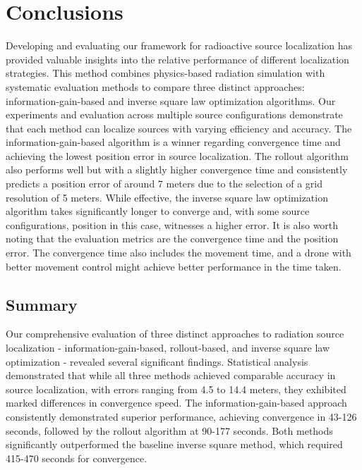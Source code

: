 \documentclass[../report.tex]{subfiles}
\begin{document}
    \section{Conclusions}
    \label{sec:conclusions}
    Developing and evaluating our framework for radioactive source localization has provided valuable insights into the relative performance of different 
    localization strategies. This method combines physics-based radiation simulation with systematic evaluation methods to compare three distinct approaches: information-gain-based
    and inverse square law optimization algorithms. Our experiments and evaluation across multiple source configurations demonstrate that each method can localize sources with
    varying efficiency and accuracy. The information-gain-based algorithm is a winner regarding convergence time and achieving the lowest
    position error in source localization. The rollout algorithm also performs well but with a slightly higher convergence time and consistently predicts a position error of around 7 meters due to the selection of a grid resolution of 5 meters. While effective, the inverse square law optimization algorithm 
    takes significantly longer to converge and, with some source configurations, position in this case, witnesses a higher error. It is also worth noting that the evaluation metrics are the convergence time and the position error. The convergence time also includes the movement time, and a 
    drone with better movement control might achieve better performance in the time taken.

    \subsection{Summary}
    \label{sec:conclusions:summary}

    Our comprehensive evaluation of three distinct approaches to radiation source localization - information-gain-based, rollout-based, and inverse square law 
    optimization - revealed several significant findings. Statistical analysis demonstrated that while all three methods achieved comparable accuracy in source 
    localization, with errors ranging from 4.5 to 14.4 meters, they exhibited marked differences in convergence speed. The information-gain-based approach 
    consistently demonstrated superior performance, achieving convergence in 43-126 seconds, followed by the rollout algorithm at 90-177 seconds. Both methods 
    significantly outperformed the baseline inverse square method, which required 415-470 seconds for convergence.
\end{document}
